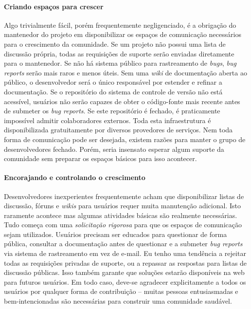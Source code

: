 \paragraph*{Criando espaços para crescer}
Algo trivialmente fácil, porém frequentemente negligenciado, é a obrigação do
mantenedor do projeto em disponibilizar os espaços de comunicação necessários
para o crescimento da comunidade. Se um projeto não possui uma lista de discussão
própria, todas as requisições de suporte serão enviadas diretamente para o
mantenedor. Se não há sistema público para rastreamento de \textit{bugs}, \textit{bug reports}
serão mais raros e menos úteis. Sem uma \textit{wiki} de documentação aberta ao público,
o desenvolvedor será o único responsável por estender e refinar a documentação. Se
o repositório do sistema de controle de versão não está acessível, usuários não serão
capazes de obter o código-fonte mais recente antes de submeter os \textit{bug reports}.
Se este repositório é fechado, é praticamente impossível admitir colaboradores externos.
Toda esta infraestrutura é disponibilizada gratuitamente por diversos provedores de
serviços. Nem toda forma de comunicação pode ser desejada, existem razões para manter
o grupo de desenvolvedores fechado. Porém, seria insensato esperar algum suporte da
comunidade sem preparar os espaços básicos para isso acontecer.

\paragraph*{Encorajando e controlando o crescimento}
Desenvolvedores inexperientes frequentemente acham que disponibilizar listas de discussão,
fóruns e \textit{wikis} para usuários requer muita manutenção adicional. Isto raramente
acontece mas algumas atividades básicas são realmente necessárias. Tudo começa com uma
\textit{solicitação rigorosa} para que os espaços de comunicação sejam utilizados. Usuários precisam
ser educados para questionar de forma pública, consultar a documentação antes
de questionar e a submeter \textit{bug reports} via sistema de rastreamento em vez de e-mail.
Eu tenho uma tendência a rejeitar todas as requisições privadas de suporte, ou a repassar
as respostas para listas de discussão públicas. Isso também garante que soluções estarão
disponíveis na web para futuros usuários. Em todo caso, deve-se agradecer explicitamente
a todos os usuários por qualquer forma de contribuição -- muitas pessoas entusiasmadas e
bem-intencionadas são necessárias para construir uma comunidade saudável.

